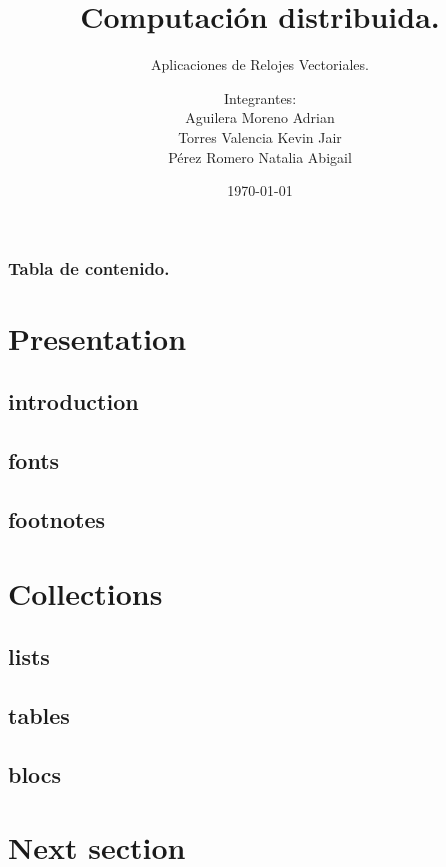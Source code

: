 \documentclass[9pt]{beamer}
\title{Computación distribuida.}
\subtitle{Aplicaciones de Relojes Vectoriales.}
\author{Integrantes:\\
        Aguilera Moreno Adrian\\
        Torres Valencia Kevin Jair\\
        Pérez Romero Natalia Abigail}
\institute{Facultad de Ciencias, UNAM}
\date{\today}
\begin{document}
\titlepage

\begin{frame}
 \frametitle{Tabla de contenido.}
 \tableofcontents
\end{frame}

\section{Presentation}

\subsection{introduction}



\def\beamer@mytheme@style{green}


\subsection{fonts}


\subsection{footnotes}



\section{Collections}

\subsection{lists}


\subsection{tables}


\subsection{blocs}








\section{Next section}
\end{document}
